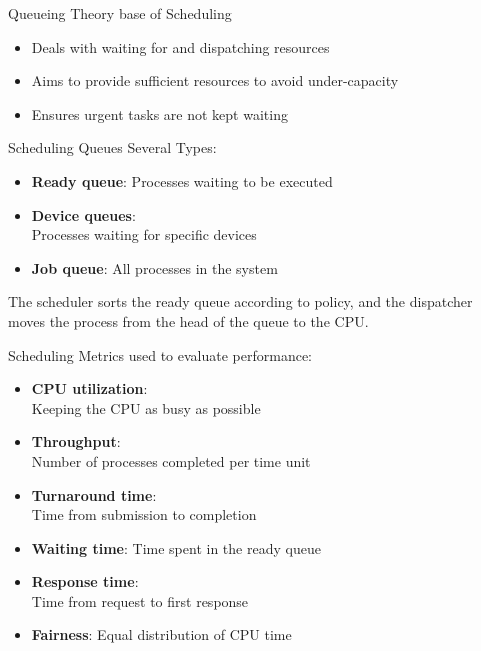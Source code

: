 \begin{lemma}{Queueing Theory} base of Scheduling
    \begin{itemize}
        \item Deals with waiting for and dispatching resources
        \item Aims to provide sufficient resources to avoid under-capacity
        \item Ensures urgent tasks are not kept waiting
    \end{itemize}
\end{lemma}

\begin{theorem}{Scheduling Queues} Several Types:
    \begin{itemize}
        \item \textbf{Ready queue}: Processes waiting to be executed
        \item \textbf{Device queues}: \\ Processes waiting for specific devices
        \item \textbf{Job queue}: All processes in the system
    \end{itemize}
    
    The scheduler sorts the ready queue according to policy, and the dispatcher moves the process from the head of the queue to the CPU.
\end{theorem}

\begin{corollary}{Scheduling Metrics} used to evaluate performance:
    \begin{itemize}
        \item \textbf{CPU utilization}: \\ Keeping the CPU as busy as possible
        \item \textbf{Throughput}: \\ Number of processes completed per time unit
        \item \textbf{Turnaround time}: \\ Time from submission to completion
        \item \textbf{Waiting time}: Time spent in the ready queue
        \item \textbf{Response time}: \\ Time from request to first response
        \item \textbf{Fairness}: Equal distribution of CPU time
    \end{itemize}
\end{corollary}



